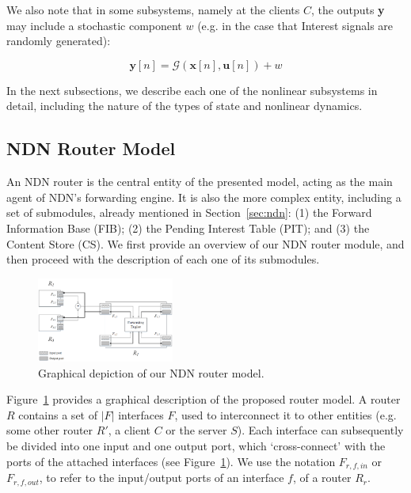 We also note that in some subsystems, namely at the clients $C$, the outputs 
\textbf{y} may include a stochastic component $w$ (e.g. in the case that Interest 
signals are randomly generated):

\begin{equation}
    \textbf{y}[n] = \mathcal{G}(\textbf{x}[n],\textbf{u}[n]) + w
    \label{eq:clients}
\end{equation}%

In the next subsections, we describe each one of the nonlinear subsystems in 
detail, including the nature of the types of state and nonlinear 
dynamics.

\subsection{NDN Router Model}
\label{subsec:meth-overview}

An NDN router is the central entity of the presented model, acting 
as the main agent of NDN's forwarding engine. It is also the more complex entity, 
including a set of submodules, already 
mentioned in Section~\ref{sec:ndn}: (1) the Forward Information Base (FIB); (2) 
the Pending Interest Table (PIT); and (3) the Content Store (CS). We first 
provide an overview of our NDN router module, and then proceed with the description 
of each one of its submodules.\shortvertbreak

\begin{figure}[h!]

    \centering
    \includegraphics[width=0.40\textwidth]{figures/ndn-router-overview.png}
    \cprotect\caption{Graphical depiction of our NDN router model.}
    \label{fig:ndn-router-overview}

\end{figure}

Figure~\ref{fig:ndn-router-overview} provides a graphical description of the proposed 
router model. A router $R$ contains a set of $|F|$ interfaces $F$, used to interconnect 
it to other entities (e.g. some other router $R'$, a client $C$ or the server 
$S$). Each interface can subsequently be divided into one input and one output 
port, which `cross-connect' with the ports of the attached 
interfaces (see Figure~\ref{fig:ndn-router-overview}). We use the notation 
$F_{r,f,in}$ or $F_{r,f,out}$, to refer to the 
input\slash output ports of an interface $f$, of a router $R_r$.\shortvertbreak

